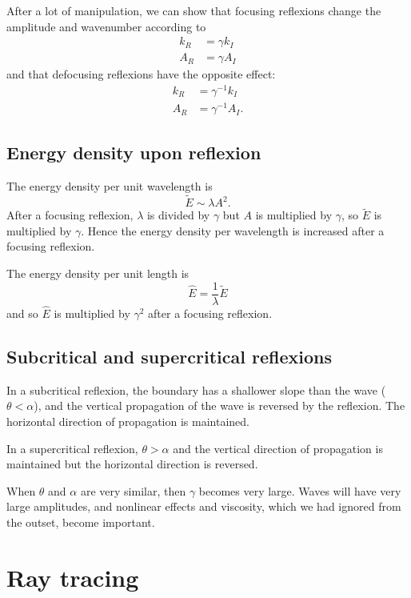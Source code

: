 After a lot of manipulation, we can show that focusing reflexions change the amplitude and wavenumber according to
\begin{align}
	k_R  &= \gamma k_I \\
	A_R &= \gamma A_I 
\end{align}
and that defocusing reflexions have the opposite effect:
\begin{align}
	k_R  &= \gamma^{-1} k_I \\
	A_R &= \gamma^{-1} A_I.
\end{align}

\subsection{Energy density upon reflexion}

The energy density per unit wavelength is 
\begin{equation}
	\tilde{E} \sim \lambda A^2.
\end{equation}
After a focusing reflexion, $\lambda$ is divided by $\gamma$ but $A$ is multiplied by $\gamma$, so $\tilde{E}$ is multiplied by $\gamma$. Hence the energy density per wavelength is increased after a focusing reflexion. 

The energy density per unit length is 
\begin{equation}
	\hat{E} = \frac{1}{\lambda} \tilde{E}
\end{equation}
and so $\hat{E}$ is multiplied by $\gamma^2$ after a focusing reflexion.

\subsection{Subcritical and supercritical reflexions}

In a subcritical reflexion, the boundary has a shallower slope than the wave
($\theta < \alpha$), and the vertical propagation of the wave is reversed by the
reflexion. The horizontal direction of propagation is maintained.

In a supercritical reflexion, $\theta > \alpha$ and the vertical direction of
propagation is maintained but the horizontal direction is reversed. 

When $\theta$ and $\alpha$ are very similar, then $\gamma$ becomes very large.
Waves will have very large amplitudes, and nonlinear effects and viscosity,
which we had ignored from the outset, become important. 

\section{Ray tracing}

